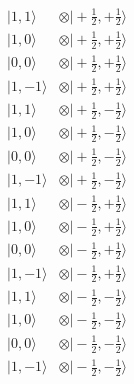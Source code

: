 \documentclass[a4paper,landscape]{article}
\begin{document}
\begin{align*}
 \bigl|1,1\bigr\rangle        &\otimes \bigl|+\tfrac12,+\tfrac12\bigr\rangle\\
 \bigl|1,0\bigr\rangle        &\otimes \bigl|+\tfrac12,+\tfrac12\bigr\rangle\\
 \bigl|0,0\bigr\rangle        &\otimes \bigl|+\tfrac12,+\tfrac12\bigr\rangle\\
 \bigl|1,-1\bigr\rangle       &\otimes \bigl|+\tfrac12,+\tfrac12\bigr\rangle\\
 \bigl|1,1\bigr\rangle        &\otimes \bigl|+\tfrac12,-\tfrac12\bigr\rangle\\
 \bigl|1,0\bigr\rangle        &\otimes \bigl|+\tfrac12,-\tfrac12\bigr\rangle\\
 \bigl|0,0\bigr\rangle        &\otimes \bigl|+\tfrac12,-\tfrac12\bigr\rangle\\
 \bigl|1,-1\bigr\rangle       &\otimes \bigl|+\tfrac12,-\tfrac12\bigr\rangle\\
 \bigl|1,1\bigr\rangle        &\otimes \bigl|-\tfrac12,+\tfrac12\bigr\rangle\\
 \bigl|1,0\bigr\rangle        &\otimes \bigl|-\tfrac12,+\tfrac12\bigr\rangle\\
 \bigl|0,0\bigr\rangle        &\otimes \bigl|-\tfrac12,+\tfrac12\bigr\rangle\\
 \bigl|1,-1\bigr\rangle       &\otimes \bigl|-\tfrac12,+\tfrac12\bigr\rangle\\
 \bigl|1,1\bigr\rangle        &\otimes \bigl|-\tfrac12,-\tfrac12\bigr\rangle\\
 \bigl|1,0\bigr\rangle        &\otimes \bigl|-\tfrac12,-\tfrac12\bigr\rangle\\
 \bigl|0,0\bigr\rangle        &\otimes \bigl|-\tfrac12,-\tfrac12\bigr\rangle\\
 \bigl|1,-1\bigr\rangle       &\otimes \bigl|-\tfrac12,-\tfrac12\bigr\rangle
\end{align*}
\end{document}
